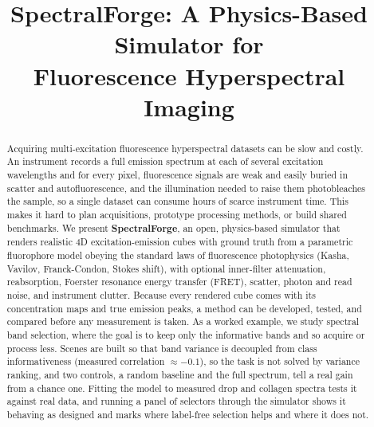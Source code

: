 \documentclass{article}
\begin{document}
\ninept

\title{SpectralForge: A Physics-Based Simulator for\\ Fluorescence Hyperspectral Imaging}

\address{$^{1}$Akian College of Science and Engineering, American University of Armenia, Yerevan, Armenia \\
$^{2}$Engineering Research Center, American University of Armenia, Yerevan, Armenia \\
$^{3}$L.A.\ Orbeli Institute of Physiology NAS RA, Yerevan, Armenia \\
$^{4}$George Washington University, Washington, DC, USA \\
\texttt{narek.h.meloyan@gmail.com}, \texttt{phynas@gwu.edu}}

\maketitle

\begin{abstract}
Acquiring multi-excitation fluorescence hyperspectral datasets can be slow and costly. An
instrument records a full emission spectrum at each of several excitation wavelengths and
for every pixel, fluorescence signals are weak and easily buried in scatter and
autofluorescence, and the illumination needed to raise them photobleaches the sample, so a
single dataset can consume hours of scarce instrument time. This makes it hard to plan
acquisitions, prototype processing methods, or build shared benchmarks. We present
\textbf{SpectralForge}, an open, physics-based simulator that renders realistic 4D
excitation-emission cubes with ground truth from a parametric fluorophore model
obeying the standard laws of fluorescence photophysics (Kasha, Vavilov, Franck-Condon,
Stokes shift), with optional inner-filter attenuation, reabsorption, Foerster resonance
energy transfer (FRET), scatter, photon and read noise, and instrument clutter. Because
every rendered cube comes with its concentration maps and true emission peaks, a method can
be developed, tested, and compared before any measurement is taken. As a worked
example, we study spectral band selection, where the goal is to keep
only the informative bands and so acquire or process less. Scenes are built so that band
variance is decoupled from class informativeness (measured correlation $\approx -0.1$), so the
task is not solved by variance ranking, and two controls, a random baseline and the full
spectrum, tell a real gain from a chance one. Fitting the model to measured drop and collagen spectra tests it against real data, and running a panel of selectors through the
simulator shows it behaving as designed and marks where label-free selection helps and
where it does not.
\end{abstract}
\end{document}
